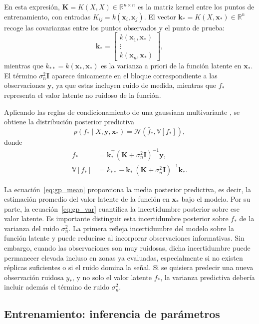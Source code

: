 En esta expresión, \(\bm{K}=K(X,X)\in\mathbb{R}^{n\times n}\) es la matriz kernel entre los
puntos de entrenamiento, con entradas
\(
K_{ij}=k(\bm{x}_i,\bm{x}_j).
\)
El vector \(\bm{k}_*=K(X,\bm{x}_*)\in\mathbb{R}^n\) recoge las covarianzas entre los puntos
observados y el punto de prueba:
\[
\bm{k}_*
=
\begin{bmatrix}
k(\bm{x}_1,\bm{x}_*) \\
\vdots \\
k(\bm{x}_n,\bm{x}_*)
\end{bmatrix},
\]
mientras que
\(
k_{**}=k(\bm{x}_*,\bm{x}_*)
\)
es la varianza a priori de la función latente en \(\bm{x}_*\). El término
\(\sigma_n^2\bm{I}\) aparece únicamente en el bloque correspondiente a las observaciones
\(\bm{y}\), ya que estas incluyen ruido de medida, mientras que \(f_*\) representa el valor
latente no ruidoso de la función.

Aplicando las reglas de condicionamiento de una gaussiana multivariante
\cite{rasmussen2006gpml}, se obtiene la distribución posterior predictiva
\[
p(f_*\mid X,\bm{y},\bm{x}_*)
=
\mathcal{N}(\bar{f}_*,\mathbb{V}[f_*]),
\]
donde
\begin{align}
\bar{f}_*
&=
\bm{k}_*^\top
(\bm{K}+\sigma_n^2\bm{I})^{-1}
\bm{y},
\label{eq:gp_mean}
\\
\mathbb{V}[f_*]
&=
k_{**}
-
\bm{k}_*^\top
(\bm{K}+\sigma_n^2\bm{I})^{-1}
\bm{k}_*.
\label{eq:gp_var}
\end{align}

La ecuación~\eqref{eq:gp_mean} proporciona la media posterior predictiva, es decir, la
estimación promedio del valor latente de la función en \(\bm{x}_*\) bajo el modelo. Por su
parte, la ecuación~\eqref{eq:gp_var} cuantifica la incertidumbre posterior sobre ese valor
latente.
Es importante distinguir esta incertidumbre posterior sobre \(f_*\) de la varianza del ruido
\(\sigma_n^2\). La primera refleja incertidumbre del modelo sobre la función
latente y puede reducirse al incorporar observaciones informativas. Sin embargo, cuando las
observaciones son muy ruidosas, dicha incertidumbre puede permanecer elevada incluso en
zonas ya evaluadas, especialmente si no existen réplicas suficientes o si el ruido domina la
señal. Si se quisiera predecir una nueva observación ruidosa \(y_*\), y no solo el valor
latente \(f_*\), la varianza predictiva debería incluir además el término de ruido
\(\sigma_n^2\).
\subsection{Entrenamiento: inferencia de parámetros}

